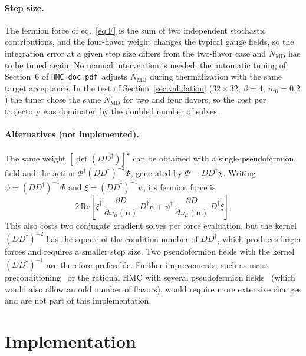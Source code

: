 \documentclass[11pt,a4paper]{article}
\newcommand{\n}{\mathbf{n}}
\newcommand{\NMD}{N_{\mathrm{MD}}}
\newcommand{\hmcdoc}{\texttt{HMC\_doc.pdf}}
\begin{document}
\paragraph{Step size.}
The fermion force of eq.~\eqref{eq:F} is the sum of two independent stochastic contributions, and the four-flavor
weight changes the typical gauge fields, so the integration error at a given step size differs from the two-flavor
case and $\NMD$ has to be tuned again. No manual intervention is needed: the automatic tuning of Section~6 of
\hmcdoc\ adjusts $\NMD$ during thermalization with the same target acceptance. In the test of
Section~\ref{sec:validation} ($32\times32$, $\beta=4$, $m_0=0.2$) the tuner chose the same $\NMD$ for two and four
flavors, so the cost per trajectory was dominated by the doubled number of solves.

\paragraph{Alternatives (not implemented).}
The same weight $[\det(DD^\dagger)]^2$ can be obtained with a single pseudofermion field and the action
$\Phi^\dagger(DD^\dagger)^{-2}\Phi$, generated by $\Phi = DD^\dagger\chi$. Writing $\psi = (DD^\dagger)^{-1}\Phi$
and $\xi = (DD^\dagger)^{-1}\psi$, its fermion force is
\begin{equation}
    2\,\mathrm{Re}\left[\xi^\dagger\,\frac{\partial D}{\partial\omega_\mu(\n)}\,D^\dagger\psi
    + \psi^\dagger\,\frac{\partial D}{\partial\omega_\mu(\n)}\,D^\dagger\xi\right].
\end{equation}
This also costs two conjugate gradient solves per force evaluation, but the kernel $(DD^\dagger)^{-2}$ has the
square of the condition number of $DD^\dagger$, which produces larger forces and requires a smaller step size.
Two pseudofermion fields with the kernel $(DD^\dagger)^{-1}$ are therefore preferable. Further improvements, such as
mass preconditioning~\cite{Hasenbusch2001} or the rational HMC with several pseudofermion
fields~\cite{ClarkKennedy2007} (which would also allow an odd number of flavors), would require more extensive
changes and are not part of this implementation.

\section{Implementation}
\label{sec:code}
\end{document}
